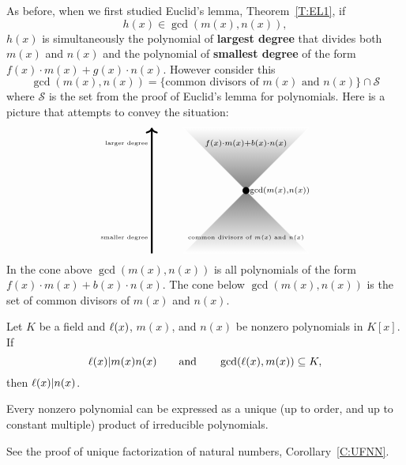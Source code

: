 \documentclass{ximera}
\begin{document}
As before, when we first studied Euclid's lemma, Theorem~\ref{T:EL1},
if
\[
h(x)\in\gcd(m(x),n(x)),
\]
$h(x)$ is simultaneously the polynomial of \textbf{largest degree}
that divides both $m(x)$ and $n(x)$ and the polynomial of
\textbf{smallest degree} of the form $f(x)\cdot m(x) + g(x)\cdot
n(x)$. However consider this
\[
\gcd(m(x),n(x)) = \{\text{common divisors of $m(x)$ and $n(x)$}\}\cap \mathcal{S}
\]
where $\mathcal{S}$ is the set from the proof of Euclid's lemma for
polynomials. Here is a picture that attempts to convey the situation:
\[
\begin{tikzpicture}
  \draw[white,thin,shading = axis, top color = white, bottom color = gray] (-2,2) -- (0,0)-- (2,2) -- (-2,2) -- cycle;
  \draw[white,thin,shading = axis, bottom color = white, top color = gray] (-2,-2) -- (0,0)-- (2,-2) -- (-2,-2) -- cycle;
  \filldraw (0,0) circle (3pt);
  \node[right] at (0,0) {$\scriptstyle\gcd(m(x),n(x))$};
  \node at (0,1.5) {$\scriptstyle f(x)\cdot m(x) + b(x)\cdot n(x)$};
  \node at (0,-1.5) {\text{\tiny common divisors of $m(x)$ and $n(x)$}};
  \draw[->,ultra thick] (-3,-2) -- (-3,2);
  \node[left] at (-3,-1.5) {\text{\tiny smaller degree}};
  \node[left] at (-3,1.5) {\text{\tiny larger degree}};
\end{tikzpicture}
\]
In the cone above $\gcd(m(x),n(x))$ is all polynomials of the form
$f(x)\cdot m(x) + b(x)\cdot n(x)$. The cone below $\gcd(m(x),n(x))$ is the
set of common divisors of $m(x)$ and $n(x)$.




\begin{corollary}\label{C:ELP2}
  Let $K$ be a field and $\ell(x)$, $m(x)$, and $n(x)$ be nonzero
  polynomials in $K[x]$. If
  \[
  \ell(x)|m(x)n(x)\qquad\text{and}\qquad \gcd(\ell(x),m(x))\subseteq K,
  \]
  then $\ell(x)|n(x)$.
\end{corollary}


\begin{corollary}\label{C:UFP}
  Every nonzero polynomial can be expressed as a unique (up to order,
  and up to constant multiple) product of irreducible polynomials.
  \begin{sketch}
    See the proof of unique factorization of natural numbers,
    Corollary~\ref{C:UFNN}.
  \end{sketch}
\end{corollary}
\end{document}
